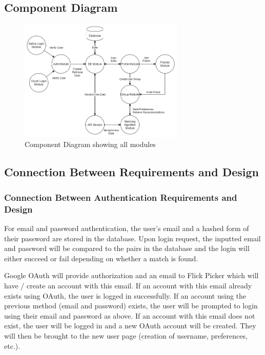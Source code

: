 \documentclass[12pt, titlepage]{article}
\begin{document}
\subsection{Component Diagram}
\begin{figure}[H]
	\centering
	\includegraphics[width=0.7\textwidth]{ComponentDiagram-rev1.png}
	\caption{Component Diagram showing all modules}
	\label{FigUH}
\end{figure}

\subsection{Connection Between Requirements and Design} \label{SecConnection}

\subsubsection{Connection Between Authentication Requirements and Design}
\hspace*{14pt} For email and password authentication, the user's email and a hashed form of their password are stored in the database. Upon login request, the inputted email and password will be compared to the pairs in the database and the login will either succeed or fail depending on whether a match is found. 

Google OAuth will provide authorization and an email to Flick Picker which will have / create an account with this email. If an account with this email already exists using OAuth, the user is logged in successfully. If an account using the previous method (email and password) exists, the user will be prompted to login using their email and password as above. If an account with this email does not exist, the user will be logged in and a new OAuth account will be created. They will then be brought to the new user page (creation of username, preferences, etc.). 
\end{document}
